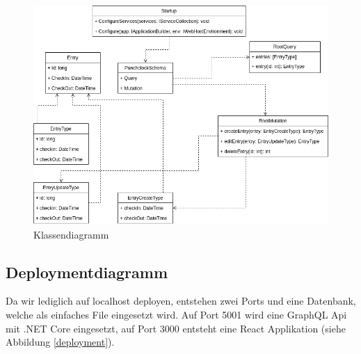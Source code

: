 \documentclass[a4paper, titlepage]{article}
\begin{document}
    \begin{figure}
        \includegraphics[width=\textwidth]{images/Klassendiagramm.png}
        \caption{Klassendiagramm}
        \label{classdiagram}
    \end{figure}

    \subsection{Deploymentdiagramm}
    Da wir lediglich auf localhost deployen, entstehen zwei Ports und eine
    Datenbank, welche als einfaches File eingesetzt wird. Auf Port 5001
    wird eine GraphQL Api mit .NET Core eingesetzt, auf Port 3000 entsteht
    eine React Applikation (siehe Abbildung \ref{deployment}).
\end{document}
